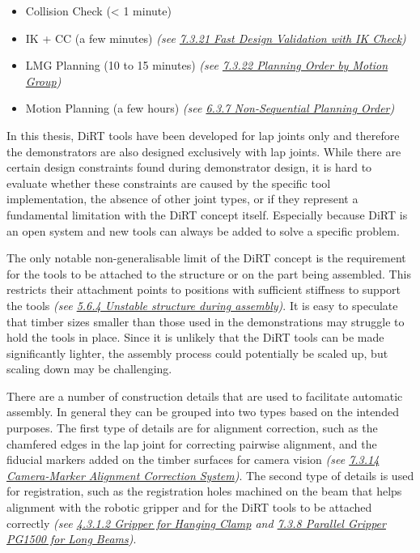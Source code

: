 \begin{itemize}
	\item Collision Check (< 1 minute)

	\item IK + CC (a few minutes) \textit{(see \uline{7.3.21 Fast Design Validation with IK Check})}

	\item LMG Planning (10 to 15 minutes) \textit{(see \uline{7.3.22 Planning Order by Motion Group})}

	\item Motion Planning (a few hours) \textit{(see \uline{6.3.7 Non-Sequential Planning Order})}

\end{itemize}

In this thesis, DiRT tools have been developed for lap joints only and therefore the demonstrators are also designed exclusively with lap joints. While there are certain design constraints found during demonstrator design, it is hard to evaluate whether these constraints are caused by the specific tool implementation, the absence of other joint types, or if they represent a fundamental limitation with the DiRT concept itself. Especially because DiRT is an open system and new tools can always be added to solve a specific problem.

The only notable non-generalisable limit of the DiRT concept is the requirement for the tools to be attached to the structure or on the part being assembled. This restricts their attachment points to positions with sufficient stiffness to support the tools \textit{(see \uline{5.6.4 Unstable structure during assembly})}. It is easy to speculate that timber sizes smaller than those used in the demonstrations may struggle to hold the tools in place. Since it is unlikely that the DiRT tools can be made significantly lighter, the assembly process could potentially be scaled up, but scaling down may be challenging.


There are a number of construction details that are used to facilitate automatic assembly. In general they can be grouped into two types based on the intended purposes. The first type of details are for alignment correction, such as the chamfered edges in the lap joint for correcting pairwise alignment, and the fiducial markers added on the timber surfaces for camera vision \textit{(see \uline{7.3.14 Camera-Marker Alignment Correction System})}. The second type of details is used for registration, such as the registration holes machined on the beam that helps alignment with the robotic gripper and for the DiRT tools to be attached correctly \textit{(see \uline{4.3.1.2 Gripper for Hanging Clamp} and \uline{7.3.8 Parallel Gripper PG1500 for Long Beams})}.

